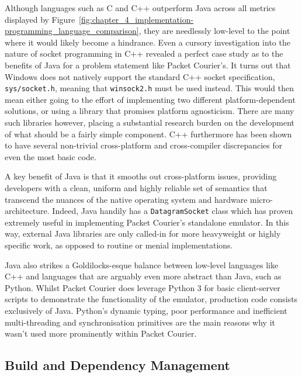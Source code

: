 Although languages such as C and C++ outperform Java across all metrics displayed by
Figure~\ref{fig:chapter_4_implementation-programming_language_comparison}, they are needlessly low-level to the point
where it would likely become a hindrance. Even a cursory investigation into the nature of socket programming in C++
revealed a perfect case study as to the benefits of Java for a problem statement like Packet Courier's. It turns out
that Windows does not natively support the standard C++ socket specification, \texttt{sys/socket.h}, meaning that
\texttt{winsock2.h} must be used instead\cite{socket_vs_winsock}. This would then mean either going to the effort of
implementing two different platform-dependent solutions, or using a library that promises platform agnosticism. There
are many such libraries however\cite{c++_socket_libraries}, placing a substantial research burden on the development
of what should be a fairly simple component. C++ furthermore has been shown to have several non-trivial cross-platform
and cross-compiler discrepancies for even the most basic code\cite{c++_cross_compiler_differences,
    c++_statistical_differences, c++_random_differences, c++_filesystem_differences}.

A key benefit of Java is that it smooths out cross-platform issues, providing developers with a clean, uniform and
highly reliable set of semantics that transcend the nuances of the native operating system and hardware
micro-architecture. Indeed, Java handily has a \texttt{DatagramSocket} class\cite{java_DatagramSocket} which has
proven extremely useful in implementing Packet Courier's standalone emulator. In this way, external Java libraries
are only called-in for more heavyweight or highly specific work, as opposed to routine or menial implementations.

Java also strikes a Goldilocks-esque balance\cite{goldilocks_effect} between low-level languages like C++ and
languages that are arguably even more abstract than Java, such as Python. Whilst Packet Courier does leverage Python
3\cite{python_3} for basic client-server scripts to demonstrate the functionality of the emulator, production code
consists exclusively of Java. Python's dynamic typing\cite{python_typing}, poor
performance\cite{programming_language_efficiency} and inefficient multi-threading and synchronisation
primitives\cite{python_gil} are the main reasons why it wasn't used more prominently within Packet Courier.

\subsection{Build and Dependency Management}

